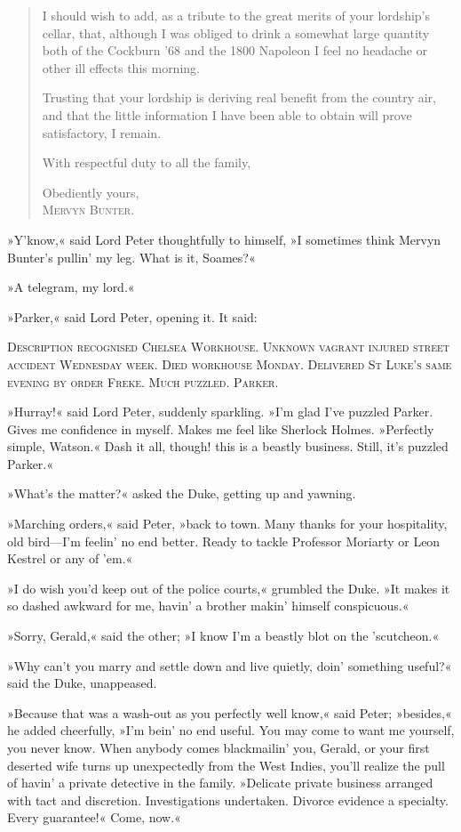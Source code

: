 \begin{quotation}
I should wish to add, as a tribute to the great merits of your lordship's cellar, that, although I was obliged to drink a somewhat large quantity both of the Cockburn '68 and the 1800 Napoleon I feel no headache or other ill effects this morning.

Trusting that your lordship is deriving real benefit from the country air, and that the little information I have been able to obtain will prove satisfactory, I remain.

With respectful duty to all the family,

\begin{flushright}
Obediently yours,\\
\textsc{Mervyn Bunter.}
\end{flushright}
\end{quotation}

»Y'know,« said Lord Peter thoughtfully to himself, »I sometimes think Mervyn Bunter's pullin' my leg. What is it, Soames?«

»A telegram, my lord.«

»Parker,« said Lord Peter, opening it. It said:

\textsc{Description recognised Chelsea Workhouse. Unknown vagrant injured street accident Wednesday week. Died workhouse Monday. Delivered St Luke's same evening by order Freke. Much puzzled. Parker.}

»Hurray!« said Lord Peter, suddenly sparkling. »I'm glad I've puzzled Parker. Gives me confidence in myself. Makes me feel like Sherlock Holmes. »Perfectly simple, Watson.« Dash it all, though! this is a beastly business. Still, it's puzzled Parker.«

»What's the matter?« asked the Duke, getting up and yawning.

»Marching orders,« said Peter, »back to town. Many thanks for your hospitality, old bird—I'm feelin' no end better. Ready to tackle Professor Moriarty or Leon Kestrel or any of 'em.«

»I do wish you'd keep out of the police courts,« grumbled the Duke. »It makes it so dashed awkward for me, havin' a brother makin' himself conspicuous.«

»Sorry, Gerald,« said the other; »I know I'm a beastly blot on the 'scutcheon.«

»Why can't you marry and settle down and live quietly, doin' something useful?« said the Duke, unappeased.

»Because that was a wash-out as you perfectly well know,« said Peter; »besides,« he added cheerfully, »I'm bein' no end useful. You may come to want me yourself, you never know. When anybody comes blackmailin' you, Gerald, or your first deserted wife turns up unexpectedly from the West Indies, you'll realize the pull of havin' a private detective in the family. »Delicate private business arranged with tact and discretion. Investigations undertaken. Divorce evidence a specialty. Every guarantee!« Come, now.«

